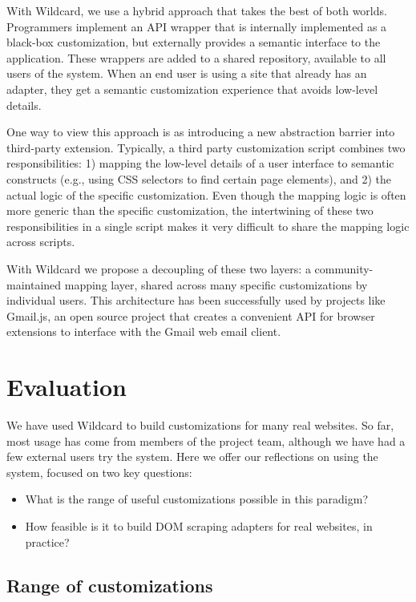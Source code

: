 \documentclass[sigplan,10pt,anonymous,review]{acmart}
\providecommand{\tightlist}{%
  \setlength{\itemsep}{0pt}\setlength{\parskip}{0pt}}
\begin{document}
With Wildcard, we use a hybrid approach that takes the best of both
worlds. Programmers implement an API wrapper that is internally
implemented as a black-box customization, but externally provides a
semantic interface to the application. These wrappers are added to a
shared repository, available to all users of the system. When an end
user is using a site that already has an adapter, they get a semantic
customization experience that avoids low-level details.

One way to view this approach is as introducing a new abstraction
barrier into third-party extension. Typically, a third party
customization script combines two responsibilities: 1) mapping the
low-level details of a user interface to semantic constructs (e.g.,
using CSS selectors to find certain page elements), and 2) the actual
logic of the specific customization. Even though the mapping logic is
often more generic than the specific customization, the intertwining of
these two responsibilities in a single script makes it very difficult to
share the mapping logic across scripts.

With Wildcard we propose a decoupling of these two layers: a
community-maintained mapping layer, shared across many specific
customizations by individual users. This architecture has been
successfully used by projects like Gmail.js, an open source project that
creates a convenient API for browser extensions to interface with the
Gmail web email client.

\hypertarget{sec:evaluation}{%
\section{Evaluation}\label{sec:evaluation}}

We have used Wildcard to build customizations for many real websites. So
far, most usage has come from members of the project team, although we
have had a few external users try the system. Here we offer our
reflections on using the system, focused on two key questions:

\begin{itemize}
\tightlist
\item
  What is the range of useful customizations possible in this paradigm?
\item
  How feasible is it to build DOM scraping adapters for real websites,
  in practice?
\end{itemize}

\hypertarget{range-of-customizations}{%
\subsection{Range of customizations}\label{range-of-customizations}}
\end{document}
